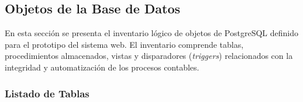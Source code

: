 \subsection{Objetos de la Base de Datos}
\label{sec:cap4_objetos_bd}

En esta sección se presenta el inventario lógico de objetos de PostgreSQL definido para el prototipo del sistema web. El inventario comprende tablas, procedimientos almacenados, vistas y disparadores (\textit{triggers}) relacionados con la integridad y automatización de los procesos contables.

\subsubsection{Listado de Tablas}

